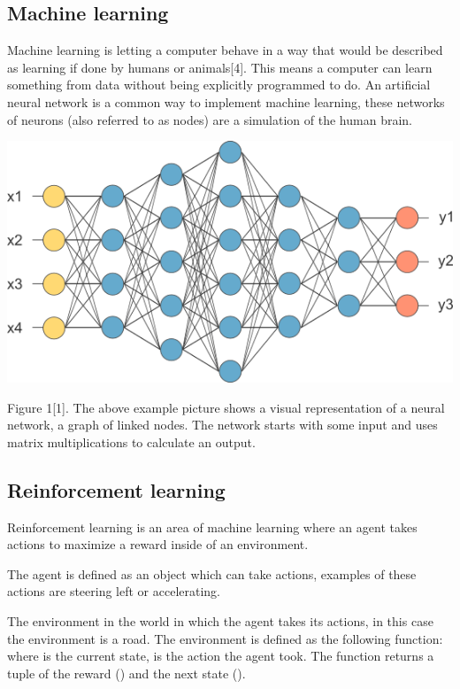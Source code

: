 \documentclass{article}
\begin{document}
\subsection{Machine learning}
Machine learning is letting a computer behave in a way that would be described as learning if done by humans or animals[4]. This means a computer can learn something from data without being explicitly programmed to do. An artificial neural network is a common way to implement machine learning, these networks of neurons (also referred to as nodes) are a simulation of  the human brain. 

\begin{center}
\includegraphics[width=\linewidth]{neural_net}
\end{center}

\begin{flushleft}
Figure 1[1]. The above example picture shows a visual representation of a neural network, a graph of linked nodes. The network starts with some input and uses matrix multiplications to calculate an output. 
\end{flushleft}

\subsection{Reinforcement learning}
Reinforcement learning is an area of machine learning where an agent takes actions to maximize a reward inside of an environment. 

\begin{flushleft}
The agent is defined as an object which can take actions, examples of these actions are steering left or accelerating. 
\end{flushleft}

\begin{flushleft}
The environment in the world in which the agent takes its actions, in this case the environment is a road. The environment is defined as the following function:  where  is the current state,  is the action the agent took. The function returns a tuple of the reward () and the next state ().
\end{flushleft}
\end{document}
